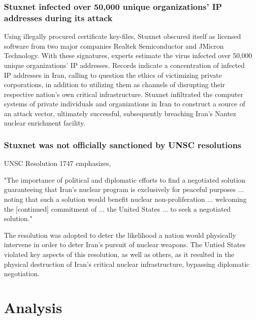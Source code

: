 \documentclass[12pt]{article}
\begin{document}
\begin{multicols}{2}
\subsubsection{Stuxnet infected over 50,000 unique organizations' IP addresses during its attack}

Using illegally procured certificate key-files, Stuxnet obscured itself as licensed software from two major companies Realtek Semiconductor and JMicron Technology. With these signatures, experts estimate the virus infected over 50,000 unique organizations' IP addresses.\cite{lessonsFromStuxnet} Records indicate a concentration of infected IP addresses in Iran, calling to question the ethics of victimizing private corporations, in addition to  utilizing them as channels of disrupting their respective nation's own critical infrastructure. Stuxnet infiltrated the computer systems of private individuals and organizations in Iran to construct a source of an attack vector, ultimately successful, subsequently breaching Iran's Nantez nuclear enrichment facility.\cite{w32.stuxnetDossier} 

\subsubsection{Stuxnet was not officially sanctioned by UNSC resolutions}

UNSC Resolution 1747 emphasizes,
\begin{displayquote}
"The importance of political and diplomatic efforts to find a negotiated solution guaranteeing that Iran’s nuclear program is exclusively for peaceful purposes ... noting that such a solution would benefit nuclear non-proliferation ... welcoming the [continued] commitment of ... the United States ... to seek a negotiated solution."\cite{resolution1747}
\end{displayquote}

The resolution was adopted to deter the likelihood a nation would physically intervene in order to deter Iran's pursuit of nuclear weapons. The Untied States violated key aspects of this resolution, as well as others, as it resulted in the physical destruction of Iran's critical nuclear infrastructure, bypassing diplomatic negotiation.


\section{Analysis}


\end{multicols}
\end{document}

